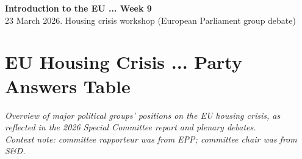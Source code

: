 \documentclass[10pt,a4paper]{article}
\begin{document}
\begin{center}
{\large\bfseries\color{eublue} Introduction to the EU ... Week 9}\\[0.2em]
\footnotesize 23 March 2026. Housing crisis workshop (European Parliament group debate)
\end{center}\vspace{0.5em}

\section*{\color{eublue}EU Housing Crisis ... Party Answers Table}
\textit{Overview of major political groups' positions on the EU housing crisis, as reflected in the 2026 Special Committee report and plenary debates.}\\
\textit{Context note: committee rapporteur was from EPP; committee chair was from S\&D.}
\end{document}
